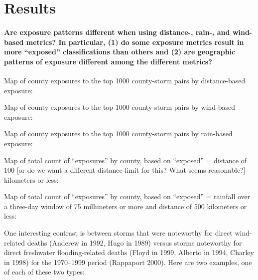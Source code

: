 \documentclass[]{elsarticle} %
\begin{document}
\section{Results}\label{results}

\paragraph{\texorpdfstring{Are exposure patterns different when using
distance-, rain-, and wind-based metrics? In particular, (1) do some
exposure metrics result in more ``exposed'' classifications than others
and (2) are geographic patterns of exposure different among the
different
metrics?}{Are exposure patterns different when using distance-, rain-, and wind-based metrics? In particular, (1) do some exposure metrics result in more exposed classifications than others and (2) are geographic patterns of exposure different among the different metrics?}}\label{are-exposure-patterns-different-when-using-distance--rain--and-wind-based-metrics-in-particular-1-do-some-exposure-metrics-result-in-more-exposed-classifications-than-others-and-2-are-geographic-patterns-of-exposure-different-among-the-different-metrics}

Map of county exposures to the top 1000 county-storm pairs by
distance-based exposure:

Map of county exposures to the top 1000 county-storm pairs by wind-based
exposure:

Map of county exposures to the top 1000 county-storm pairs by rain-based
exposure:

Map of total count of ``exposures'' by county, based on ``exposed'' =
distance of 100 {[}or do we want a different distance limit for this?
What seems reasonable?{]} kilometers or less:

Map of total count of ``exposures'' by county, based on ``exposed'' =
rainfall over a three-day window of 75 millimeters or more and distance
of 500 kilometers or less:

One interesting contrast is between storms that were noteworthy for
direct wind-related deaths (Anderew in 1992, Hugo in 1989) versus storms
noteworthy for direct freshwater flooding-related deaths (Floyd in 1999,
Alberto in 1994, Charley in 1998) for the 1970--1999 period (Rappaport
2000). Here are two examples, one of each of these two types:
\end{document}
